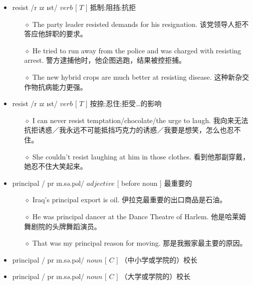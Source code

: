 \documentclass[a4paper,top=2.5cm,buttom=2.5cm10.5pt]{book}
\begin{document}
\begin{itemize}
\item resist /r \i  \textprimstress z \i st/ $ verb $ [  $ T $  ] 抵制;阻挡;抗拒
\begin{itemize}
\item[$\diamond$] The party leader resisted demands for his resignation.
该党领导人拒不答应他辞职的要求。
\item[$\diamond$] He tried to run away from the police and was charged with resisting arrest.
警方逮捕他时，他企图逃跑，结果被控拒捕。
\item[$\diamond$] The new hybrid crops are much better at resisting disease.
这种新杂交作物抗病能力更强。
\end{itemize}
\end{itemize}
\begin{itemize}
\item resist /r \i  \textprimstress z \i st/ $ verb $ [  $ T $  ] 按捺;忍住;拒受…的影响
\begin{itemize}
\item[$\diamond$] I can never resist temptation/chocolate/the urge to laugh.
我向来无法抗拒诱惑／我永远不可能抵挡巧克力的诱惑／我要是想笑，怎么也忍不住。
\item[$\diamond$] She couldn't resist laughing at him in those clothes.
看到他那副穿戴，她忍不住大笑起来。
\end{itemize}
\end{itemize}
\begin{itemize}
\item principal / \textprimstress pr \i n.sə.pəl/ $ adjective $ [ before noun ] 最重要的
\begin{itemize}
\item[$\diamond$] Iraq's principal export is oil.
伊拉克最重要的出口商品是石油。
\item[$\diamond$] He was principal dancer at the Dance Theatre of Harlem.
他是哈莱姆舞剧院的头牌舞蹈演员。
\item[$\diamond$] That was my principal reason for moving.
那是我搬家最主要的原因。
\end{itemize}
\end{itemize}
\begin{itemize}
\item principal / \textprimstress pr \i n.sə.pəl/ $ noun $ [  $ C $  ] （中小学或学院的）校长
\end{itemize}
\begin{itemize}
\item principal / \textprimstress pr \i n.sə.pəl/ $ noun $ [  $ C $  ] （大学或学院的）校长
\end{itemize}
\end{document}
